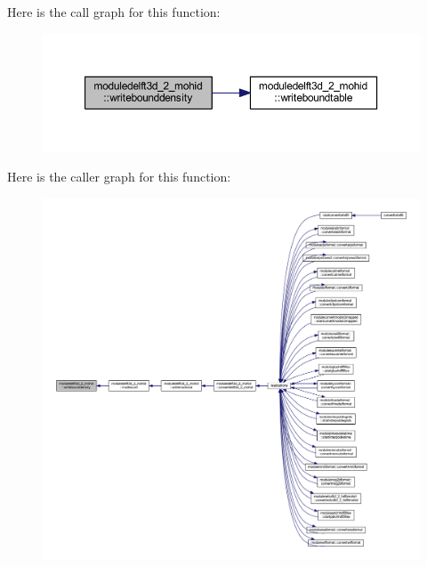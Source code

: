Here is the call graph for this function\+:\nopagebreak
\begin{figure}[H]
\begin{center}
\leavevmode
\includegraphics[width=350pt]{namespacemoduledelft3d__2__mohid_ae59d00e73feaf12262e517adad081642_cgraph}
\end{center}
\end{figure}
Here is the caller graph for this function\+:\nopagebreak
\begin{figure}[H]
\begin{center}
\leavevmode
\includegraphics[width=350pt]{namespacemoduledelft3d__2__mohid_ae59d00e73feaf12262e517adad081642_icgraph}
\end{center}
\end{figure}
\mbox{\label{namespacemoduledelft3d__2__mohid_a1a45560fe1480c753bc904201b817966}} 
